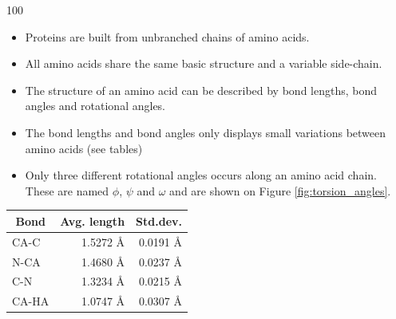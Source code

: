 \documentclass[a0,portrait]{a0poster}
\begin{document}
\begin{GridBlockFill}{0}{37.5}{100}

\renewcommand{\labelitemi}{--\ }

  \begin{multicols}{2}
\begin{minipage}{\linewidth} 
    \begin{multicols}{2}

    \begin{itemize}
    \item Proteins are built from unbranched chains of amino acids.
    \item All amino acids share
      the same basic structure and a variable side-chain.
    \item The structure of an amino acid can be described by bond lengths,
      bond angles and rotational angles.
    \item The bond lengths and bond angles only displays small variations
      between amino acids (see tables)
    \item Only three different rotational angles occurs along an amino
      acid chain. These are named $\phi$, $\psi$ and $\omega$ and are
      shown on Figure \ref{fig:torsion_angles}.
    \end{itemize} 
   \end{multicols}


\begin{multicols}{2}


\begin{minipage}{\linewidth} 
\centering

  \vspace{7mm}
  \begin{tabular}{lrr}
    \multicolumn{1}{c}{Bond} & \multicolumn{1}{c}{Avg. length} & \multicolumn{1}{c}{Std.dev.} \\ \midrule
    CA-C  & 1.5272 Å & 0.0191 Å\\
    N-CA  & 1.4680 Å & 0.0237 Å\\
    C-N   & 1.3234 Å & 0.0215 Å\\
    CA-HA & 1.0747 Å & 0.0307 Å\\
  \end{tabular}
  \vspace{4mm}
  \label{tab:average_bond_lengths}
\end{minipage}



\end{multicols}
\end{minipage}
\end{multicols}
\end{GridBlockFill}
\end{document}
